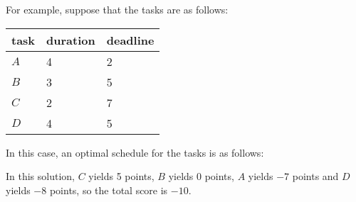 For example, suppose that the tasks are as follows:
\begin{center}
\begin{tabular}{lll}
task & duration & deadline \\
\hline
$A$ & 4 & 2 \\
$B$ & 3 & 5 \\
$C$ & 2 & 7 \\
$D$ & 4 & 5 \\
\end{tabular}
\end{center}
In this case, an optimal schedule for the tasks
is as follows:
\begin{center}
\end{center}
In this solution, $C$ yields 5 points,
$B$ yields 0 points, $A$ yields $-7$ points
and $D$ yields $-8$ points,
so the total score is $-10$.

